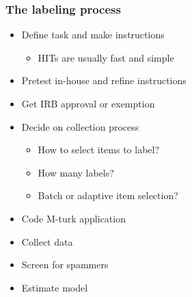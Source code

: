 \documentclass[slides]{beamer} %
\begin{document}
\begin{frame}\frametitle{The labeling process}

\begin{itemize}
  \item Define task and make instructions
\begin{itemize}
  \item HITs are usually fast and simple
\end{itemize}
  \item Pretest in-house and refine instructions
  \item Get IRB approval or exemption
  \item Decide on collection process
       \begin{itemize}
        \item How to select items to label?
        \item How many labels?
        \item Batch or adaptive item selection?
      \end{itemize}
  \item Code M-turk application
  \item Collect data
  \item Screen for spammers
  \item Estimate model
\end{itemize}

\end{frame}
\end{document}
